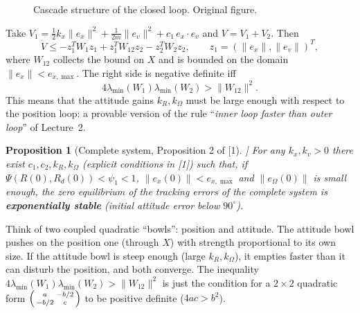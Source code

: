 \documentclass[11pt,a4paper]{article}
\newcommand{\eR}{e_R}
\newcommand{\eO}{e_\Omega}
\newcommand{\ex}{e_x}
\newcommand{\ev}{e_v}
\newcommand{\lmin}{\lambda_{\min}}
\theoremstyle{definition}
\theoremstyle{plain}
\newtheorem{proposition}[definition]{Proposition}
\theoremstyle{remark}
\begin{document}
\begin{figure}[h]
\centering
{}
\caption{Cascade structure of the closed loop. Original figure.}
\end{figure}

Take $V_1=\tfrac12k_x\|\ex\|^2+\tfrac1{2m}\|\ev\|^2+c_1\,\ex\cdot\ev$ and $V=V_1+V_2$. Then
\[
\dot V\le-z_1^TW_1z_1+z_1^TW_{12}z_2-z_2^TW_2z_2,\qquad z_1=(\|\ex\|,\|\ev\|)^T,
\]
where $W_{12}$ collects the bound on $X$ and is bounded on the domain $\|\ex\|<e_{x,\max}$. The right side is negative definite iff
\[
4\lmin(W_1)\lmin(W_2)>\|W_{12}\|^2 .
\]
This means that the attitude gains $k_R,k_\Omega$ must be large enough with respect to the position loop: a provable version of the rule ``\emph{inner loop faster than outer loop}'' of Lecture~2.

\begin{proposition}[Complete system, Proposition 2 of [1]]
For any $k_x,k_v>0$ there exist $c_1,c_2,k_R,k_\Omega$ (explicit conditions in [1]) such that, if $\Psi(R(0),R_d(0))<\psi_1<1$, $\|\ex(0)\|<e_{x,\max}$ and $\|\eO(0)\|$ is small enough, the zero equilibrium of the tracking errors of the complete system is \textbf{exponentially stable} (initial attitude error below $90^\circ$).
\end{proposition}

\begin{intuition}
Think of two coupled quadratic ``bowls'': position and attitude. The attitude bowl pushes on the position one (through $X$) with strength proportional to its own size. If the attitude bowl is steep enough (large $k_R,k_\Omega$), it empties faster than it can disturb the position, and both converge. The inequality $4\lmin(W_1)\lmin(W_2)>\|W_{12}\|^2$ is just the condition for a $2\times2$ quadratic form $\begin{psmallmatrix}a&-b/2\\-b/2&c\end{psmallmatrix}$ to be positive definite ($4ac>b^2$).
\end{intuition}
\end{document}
